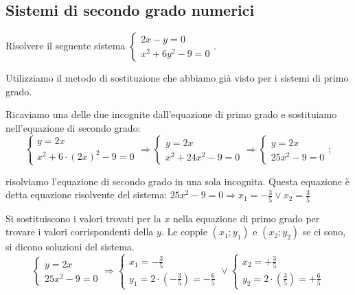 \subsection{Sistemi di secondo grado numerici}
\begin{exrig}
\begin{esempio}
Risolvere il seguente sistema \(\left\{\begin{array}{l}{2x-y=0}\\{x^2+6y^2-9=0}\end{array}\right..\)

Utilizziamo il metodo di sostituzione che abbiamo già visto per i sistemi di primo grado.
\begin{itemize*}
\item Ricaviamo una delle due incognite dall'equazione di primo grado e sostituiamo nell'equazione di secondo grado:
\[\left\{\begin{array}{l}y=2x \\
x^2+6\cdot (2x)^2-9=0\end{array}\right. 
\Rightarrow\left\{\begin{array}{l}y=2x \\
x^2+24x^2-9=0\end{array}\right. 
\Rightarrow \left\{\begin{array}{l}y=2x \\
25x^2-9=0\end{array}\right.;\]
\item risolviamo l'equazione di secondo grado in una sola incognita. Questa equazione è detta equazione risolvente del sistema:
 \(25x^2-9=0\Rightarrow x_1=-\frac 3 5\vee x_2=\frac 3 5\)
\item Si sostituiscono i valori trovati per la \( x \) nella equazione di primo grado per trovare i valori corrispondenti della \( y \). Le coppie \((x_1;y_1)\) e \((x_2;y_2)\) se ci sono, si dicono soluzioni del sistema.
\[\left\{\begin{array}{l}{y=2x}\\
{25x^2-9=0}\end{array}\right. 
\Rightarrow \left\{\begin{array}{l}x_1=-\frac 3 5 \\
y_1=2\cdot \left(-\frac 3 5\right)=-\frac 6 5\end{array}\right.\vee 
\left\{\begin{array}{l}x_2=+\frac 3 5 \\
y_2=2\cdot \left(\frac 3 5\right)=+\frac 6 5 \end{array}\right.\] 

\end{itemize*}
\end{esempio}
\end{exrig}
